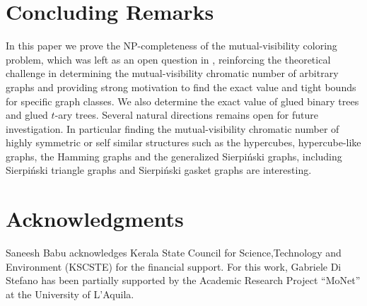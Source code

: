 \documentclass[12pt]{article}
\begin{document}
\section{Concluding Remarks}	    
In this paper we prove the NP-completeness of the mutual-visibility coloring problem, which was left as an open question in \cite{MVC1}, reinforcing the theoretical challenge in determining the mutual-visibility chromatic number of arbitrary graphs and providing strong motivation to find the exact value and tight bounds for specific graph classes. We also determine the exact value of glued binary trees and glued $t$-ary trees. Several natural directions remains open for future investigation. In particular finding the mutual-visibility chromatic number of  highly symmetric or self similar structures such as the hypercubes, hypercube-like graphs, the Hamming graphs and the generalized  Sierpi\'{n}ski graphs, including Sierpi\'{n}ski triangle graphs and Sierpi\'{n}ski gasket graphs are interesting.\par
 
\section{Acknowledgments}
Saneesh Babu acknowledges Kerala State Council for Science,Technology and Environment (KSCSTE) for the financial support. For this work, Gabriele Di Stefano has been partially supported by the Academic Research Project ``MoNet'' at the University of L'Aquila.
	    
\end{document}
